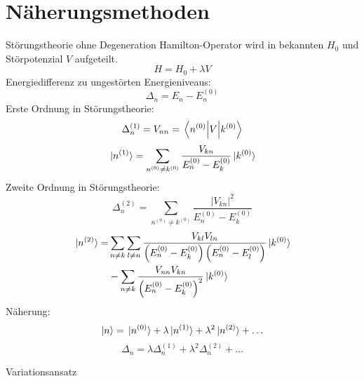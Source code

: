 \section{Näherungsmethoden}

\begin{mainbox}{Störungstheorie ohne Degeneration}
Hamilton-Operator wird in bekannten $H_0$ und Störpotenzial $V$ aufgeteilt.
\[ H = H_0 + \lambda V \]
Energiedifferenz zu ungestörten Energieniveaus:
\[\Delta_n = E_n - E_n^{(0)} \]
Erste Ordnung in Störungstheorie:
\[\Delta_n^{(1)} = V_{nn} = \mel{n^{(0)}}{V}{k^{(0)}} \]
\[\ket*{n^{(1)}} = \sum_{n^{(0)}\neq k^{(0)}} \frac{V_{kn}}{E_n^{(0)}-E_k^{(0)}} \ket*{k^{(0)}} \]
Zweite Ordnung in Störungstheorie:
\[ \Delta_n^{(2)} = \sum_{n^{(0)}\neq k^{(0)}} \frac{|V_{kn}|^2}{E_n^{(0)}-E_k^{(0)}} \]
\begin{align*}
 \ket*{n^{(2)}} =& \sum_{n\neq k} \sum_{l\neq n} \frac{V_{kl}V_{ln}}{\left(E_n^{(0)}-E_k^{(0)}\right)\left(E_n^{(0)} - E_l^{(0)}\right)} \ket*{k^{(0)}}  \\ 
 & -\sum_{n\neq k} \frac{V_{nn} V_{kn}}{\left(E_n^{(0)}-E_k^{(0)}\right)^2} \ket*{k^{(0)}}
\end{align*}
Näherung:
\[ \ket*{n} = \ket*{n^{(0)}} + \lambda \ket*{n^{(1)}} + \lambda ^2 \ket*{n^{(2)}} + \dots \]
\[ \Delta_n = \lambda \Delta_n^{(1)} + \lambda^2 \Delta_n^{(2)} + \dots \]
\end{mainbox}

    

\begin{subbox}{Variationsansatz}
    
\end{subbox}